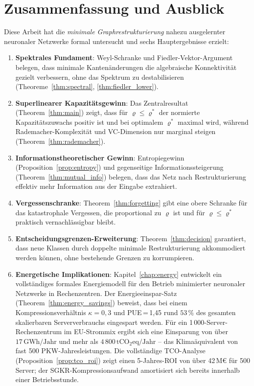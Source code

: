 \documentclass[12pt, a4paper, openany]{report}
\begin{document}
\chapter{Zusammenfassung und Ausblick}
\label{sec:conclusion}

Diese Arbeit hat die \emph{minimale Graphrestrukturierung} nahezu
ausgelernter neuronaler Netzwerke formal untersucht und sechs Hauptergebnisse
erzielt:

\begin{enumerate}
  \item \textbf{Spektrales Fundament}: Weyl-Schranke und Fiedler-Vektor-Argument
    belegen, dass minimale Kantenänderungen die algebraische Konnektivität
    gezielt verbessern, ohne das Spektrum zu destabilisieren
    (Theoreme~\ref{thm:spectral}, \ref{thm:fiedler_lower}).

  \item \textbf{Superlinearer Kapazitätsgewinn}: Das Zentralresultat
    (Theorem~\ref{thm:main}) zeigt, dass für $\varrho \leq \varrho^*$
    der normierte Kapazitätszuwachs positiv ist und bei optimalem $\varrho^*$
    maximal wird, während Rademacher-Komplexität und VC-Dimension nur
    marginal steigen (Theorem~\ref{thm:rademacher}).

  \item \textbf{Informationstheoretischer Gewinn}: Entropiegewinn
    (Proposition~\ref{prop:entropy}) und gegenseitige Informationssteigerung
    (Theorem~\ref{thm:mutual_info}) belegen, dass das Netz nach
    Restrukturierung effektiv mehr Information aus der Eingabe extrahiert.

  \item \textbf{Vergessenschranke}: Theorem~\ref{thm:forgetting} gibt
    eine obere Schranke für das katastrophale Vergessen, die proportional
    zu $\varrho$ ist und für $\varrho \leq \varrho^*$ praktisch
    vernachlässigbar bleibt.

  \item \textbf{Entscheidungsgrenzen-Erweiterung}: Theorem~\ref{thm:decision}
    garantiert, dass neue Klassen durch doppelte minimale Restrukturierung
    akkommodiert werden können, ohne bestehende Grenzen zu korrumpieren.

  \item \textbf{Energetische Implikationen}: Kapitel~\ref{chap:energy}
    entwickelt ein vollständiges formales Energiemodell für den Betrieb
    minimierter neuronaler Netzwerke in Rechenzentren.  Der
    Energieeinspar-Satz (Theorem~\ref{thm:energy_savings}) beweist, dass
    bei einem Kompressionsverhältnis $\kappa = 0{,}3$ und PUE\,=\,1{,}45
    rund $53\,\%$ des gesamten skalierbaren Serververbrauchs eingespart
    werden.  Für ein 1\,000-Server-Rechenzentrum im EU-Strommix ergibt sich
    eine Einsparung von über $17\,\mathrm{GWh/Jahr}$ und mehr als
    $4\,800\,\mathrm{tCO_2eq/Jahr}$ -- das Klimaäquivalent von fast
    500 PKW-Jahresleistungen.  Die vollständige TCO-Analyse
    (Proposition~\ref{prop:tco_roi}) zeigt einen 5-Jahres-ROI von über
    42\,M€ für 500 Server; der SGKR-Kompressionsaufwand amortisiert sich
    bereits innerhalb einer Betriebsstunde.
\end{enumerate}
\end{document}
